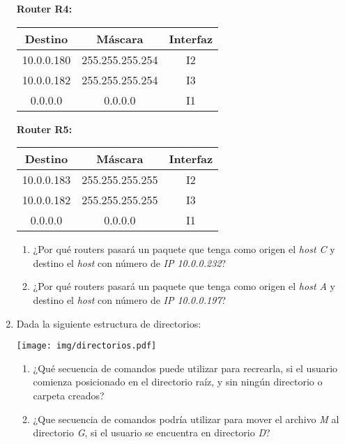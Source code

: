 \documentclass[12pt]{article}
\begin{document}
\begin{enumerate}
    \textbf{Router R4: }
    \begin{tabular}{|c|c|c|}
        \hline
        Destino & Máscara & Interfaz \\
        \hline
        10.0.0.180 & 255.255.255.254 & I2 \\
        \hline
        10.0.0.182 & 255.255.255.254 & I3 \\
        \hline
        0.0.0.0 & 0.0.0.0 & I1 \\
        \hline
    \end{tabular}

    \textbf{Router R5: }
    \begin{tabular}{|c|c|c|}
        \hline
        Destino & Máscara & Interfaz \\
        \hline
        10.0.0.183 & 255.255.255.255 & I2 \\
        \hline
        10.0.0.182 & 255.255.255.255 & I3 \\
        \hline
        0.0.0.0 & 0.0.0.0 & I1 \\
        \hline
    \end{tabular}

        \begin{enumerate}

            \item ¿Por qué routers pasará un paquete que tenga como origen el
                \emph{host C} y destino el \emph{host} con número de \emph{IP
                10.0.0.232}?

            \item ¿Por qué routers pasará un paquete que tenga como origen el
                \emph{host A} y destino el \emph{host} con número de \emph{IP
                10.0.0.197}?

        \end{enumerate}

    \item Dada la siguiente estructura de directorios:

    \texttt{[image: img/directorios.pdf]}

        \begin{enumerate}

            \item ¿Qué secuencia de comandos puede utilizar para recrearla, si
                el usuario comienza posicionado en el directorio raíz, y sin
                ningún directorio o carpeta creados?

            \item ¿Que secuencia de comandos podría utilizar para mover el
                archivo \emph{M} al directorio \emph{G}, si el usuario se
                encuentra en directorio \emph{D}?


\end{enumerate}
\end{enumerate}
\end{document}
